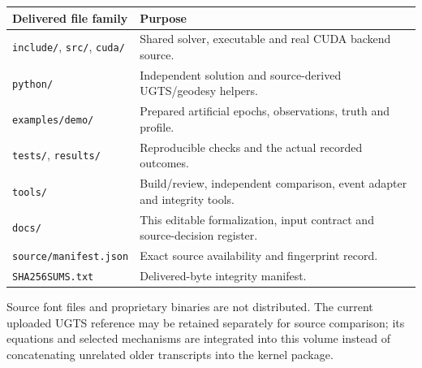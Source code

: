 \documentclass[11pt,a4paper]{article}
\newcommand{\code}[1]{\texttt{#1}}
\begin{document}
\begin{center}
\begin{tabularx}{\textwidth}{@{}P{.34\textwidth}Y@{}}\toprule
\textbf{Delivered file family} & \textbf{Purpose}\\\midrule
\code{include/}, \code{src/}, \code{cuda/} & Shared solver, executable and real CUDA backend source.\\
\code{python/} & Independent solution and source-derived UGTS/geodesy helpers.\\
\code{examples/demo/} & Prepared artificial epochs, observations, truth and profile.\\
\code{tests/}, \code{results/} & Reproducible checks and the actual recorded outcomes.\\
\code{tools/} & Build/review, independent comparison, event adapter and integrity tools.\\
\code{docs/} & This editable formalization, input contract and source-decision register.\\
\code{source/manifest.json} & Exact source availability and fingerprint record.\\
\code{SHA256SUMS.txt} & Delivered-byte integrity manifest.\\\bottomrule
\end{tabularx}
\end{center}
Source font files and proprietary binaries are not distributed. The current uploaded
UGTS reference may be retained separately for source comparison; its equations and
selected mechanisms are integrated into this volume instead of concatenating unrelated
older transcripts into the kernel package.
\clearpage
\end{document}
